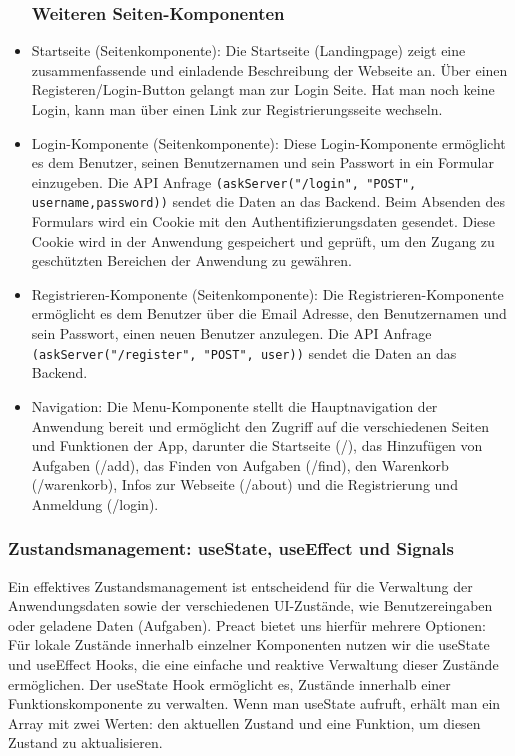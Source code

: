 \begin{itemize}
\subsubsection{Weiteren Seiten-Komponenten}

\item Startseite (Seitenkomponente):
 Die Startseite (Landingpage) zeigt eine zusammenfassende und einladende Beschreibung der Webseite an. Über einen Registeren/Login-Button gelangt man zur Login Seite. Hat man noch keine Login, kann man über einen Link zur Registrierungsseite wechseln.

\item Login-Komponente (Seitenkomponente):
Diese Login-Komponente ermöglicht es dem Benutzer, seinen Benutzernamen und sein Passwort in ein Formular einzugeben. Die API Anfrage \texttt{(askServer("/login", "POST", {username,password}))} sendet die Daten an das Backend.
Beim Absenden des Formulars wird ein Cookie mit den Authentifizierungsdaten gesendet. Diese Cookie wird in der Anwendung gespeichert und geprüft, um den Zugang zu geschützten Bereichen der Anwendung zu gewähren.


\item Registrieren-Komponente (Seitenkomponente):
Die Registrieren-Komponente ermöglicht es dem Benutzer über die Email Adresse, den Benutzernamen und sein Passwort, einen neuen Benutzer anzulegen. Die API Anfrage \texttt{(askServer("/register", "POST", user))} sendet die Daten an das Backend.

\item Navigation:
Die Menu-Komponente stellt die Hauptnavigation der Anwendung bereit und ermöglicht den Zugriff auf die verschiedenen Seiten und Funktionen der App, darunter die Startseite (/), das Hinzufügen von Aufgaben (/add), das Finden von Aufgaben (/find), den Warenkorb (/warenkorb), Infos zur Webseite (/about) und die Registrierung und Anmeldung (/login).


\end{itemize}


\subsubsection{Zustandsmanagement: useState, useEffect und Signals}



Ein effektives Zustandsmanagement ist entscheidend für die Verwaltung der Anwendungsdaten sowie der verschiedenen UI-Zustände, wie Benutzereingaben oder geladene Daten (Aufgaben). Preact bietet uns hierfür mehrere Optionen: Für lokale Zustände innerhalb einzelner Komponenten nutzen wir die useState und useEffect Hooks, die eine einfache und reaktive Verwaltung dieser Zustände ermöglichen. 
Der useState Hook ermöglicht es, Zustände innerhalb einer Funktionskomponente zu verwalten. Wenn man useState aufruft, erhält man ein Array mit zwei Werten: den aktuellen Zustand und eine Funktion, um diesen Zustand zu aktualisieren.

